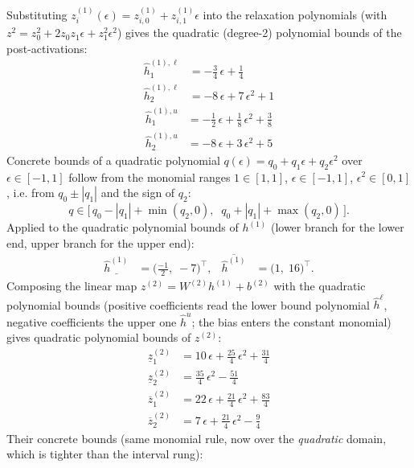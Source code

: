 \documentclass[11pt]{article}
\begin{document}
Substituting $z^{(1)}_i(\epsilon) = z^{(1)}_{i,0} + z^{(1)}_{i,1} \epsilon$ into the relaxation
polynomials (with $z^2 = z_0^2 + 2 z_0 z_1 \epsilon + z_1^2 \epsilon^2$) gives the quadratic
(degree-2) polynomial bounds of the post-activations:
\begin{align*}
\hat{h}^{(1),\ell}_{1} &= -\frac{3}{4}\,\epsilon + \frac{1}{4} \\
\hat{h}^{(1),\ell}_{2} &= -8\,\epsilon + 7\,\epsilon^2 + 1
\end{align*}
\begin{align*}
\hat{h}^{(1),u}_{1} &= -\frac{1}{2}\,\epsilon + \frac{1}{8}\,\epsilon^2 + \frac{3}{8} \\
\hat{h}^{(1),u}_{2} &= -8\,\epsilon + 3\,\epsilon^2 + 5
\end{align*}
Concrete bounds of a quadratic polynomial $q(\epsilon) = q_0 + q_1 \epsilon + q_2 \epsilon^2$ over
$\epsilon \in [-1, 1]$ follow from the monomial ranges $1 \in [1, 1]$, $\epsilon \in [-1, 1]$,
$\epsilon^2 \in [0, 1]$, i.e. from $q_0 \pm |q_1|$ and the sign of $q_2$:
\begin{equation*}
q \in \bigl[\, q_0 - |q_1| + \min(q_2, 0), \;\; q_0 + |q_1| + \max(q_2, 0) \,\bigr].
\end{equation*}
Applied to the quadratic polynomial bounds of $h^{(1)}$ (lower branch for the lower end, upper branch for the upper end):
\begin{align*}
\underline{\hat{h}^{(1)}} &= \bigl(\frac{-1}{2},\; -7\bigr)^{\!\top}, & \overline{\hat{h}^{(1)}} &= \bigl(1,\; 16\bigr)^{\!\top}.
\end{align*}
Composing the linear map $z^{(2)} = W^{(2)} h^{(1)} + b^{(2)}$ with the quadratic polynomial bounds
(positive coefficients read the lower bound polynomial $\hat{h}^{\ell}$, negative coefficients the
upper one $\hat{h}^{u}$; the bias enters the constant monomial) gives quadratic polynomial bounds of
$z^{(2)}$:
\begin{align*}
\underline{z}^{(2)}_{1} &= 10\,\epsilon + \frac{25}{4}\,\epsilon^2 + \frac{31}{4} \\
\underline{z}^{(2)}_{2} &= \frac{35}{4}\,\epsilon^2 - \frac{51}{4}
\end{align*}
\begin{align*}
\overline{z}^{(2)}_{1} &= 22\,\epsilon + \frac{21}{4}\,\epsilon^2 + \frac{83}{4} \\
\overline{z}^{(2)}_{2} &= 7\,\epsilon + \frac{21}{4}\,\epsilon^2 - \frac{9}{4}
\end{align*}
Their concrete bounds (same monomial rule, now over the \emph{quadratic} domain, which is tighter than the interval rung):
\end{document}
